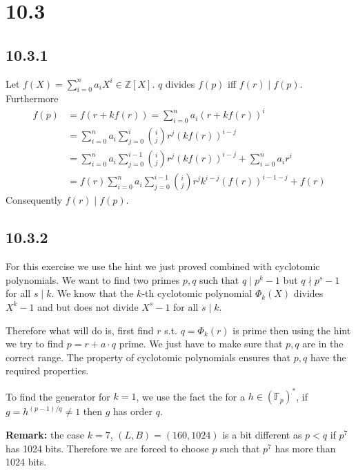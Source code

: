 \documentclass[12pt,a4paper]{article}
\begin{document}
\section{10.3}
\subsection{10.3.1}
Let $f(X) = \sum_{i=0}^n a_i X^i \in \mathbb{Z}[X]$.
$q$ divides $f(p)$ iff $f(r)\mid f(p)$. Furthermore
\[
    \begin{split}
        f(p) &= f(r + kf(r)) = \sum_{i=0}^n a_i(r+kf(r))^i\\
             &= \sum_{i=0}^n a_i \sum_{j=0}^i \binom{i}{j}r^j (kf(r))^{i-j}\\
             &= \sum_{i=0}^n a_i \sum_{j=0}^{i-1} \binom{i}{j}r^j (kf(r))^{i-j} + \sum_{i=0}^n a_i r^i\\
             &= f(r)\sum_{i=0}^n a_i \sum_{j=0}^{i-1} \binom{i}{j}r^j k^{i-j}(f(r))^{i-1-j} + f(r)
    \end{split}
\]
Consequently $f(r) \mid f(p)$.
\subsection{10.3.2}
For this exercise we use the hint we just proved combined with cyclotomic polynomials. 
We want to find two primes $p,q$ such that $q \mid p^k - 1$ but $q \nmid p^s - 1$ for all $s\mid k$.
We know that the $k$-th cyclotomic polynomial $\Phi_k(X)$ divides $X^k - 1$ and but does not divide $X^s - 1$ for all $s \mid k$.

Therefore what will do is, first find $r$ s.t. $q =\Phi_k(r)$ is prime then using the hint we try to find $p = r + a\cdot q$ prime.
We just have to make sure that $p,q$ are in the correct range. The property of cyclotomic polynomials ensures that $p,q$ have the required properties.

To find the generator for $k=1$, we use the fact the for a $h \in (\mathbb{F}_p)^*$, if $g = h^{(p-1)/q} \neq 1$ then $g$ has order $q$.

\textbf{Remark:} the case $k=7$, $(L,B) = (160,1024)$ is a bit different as $p < q$ if $p^7$ has 1024 bits. Therefore we are forced to choose $p$ such that $p^7$
 has more than 1024 bits.
\end{document}

